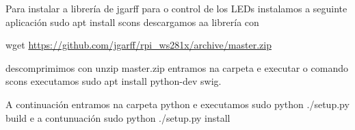 Para instalar a librería  de jgarff para o control de los LEDs instalamos a seguinte aplicación sudo apt install scons
descargamos aa librería con

 wget \url{https://github.com/jgarff/rpi_ws281x/archive/master.zip}

descomprimimos con unzip master.zip
entramos na carpeta e executar o comando scons
executamos sudo apt install python-dev swig.

A continuación entramos na carpeta python e executamos sudo python ./setup.py build e a contunuación sudo python ./setup.py install

\newpage
\thispagestyle{empty}
